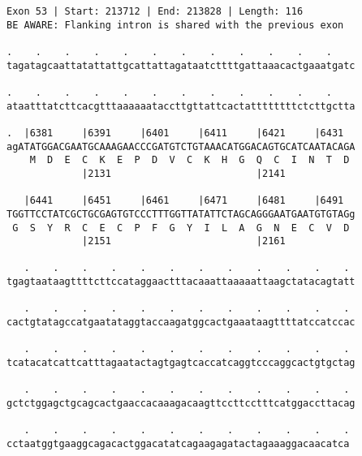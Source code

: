 \documentclass{article}
\begin{document}
\begin{Verbatim}
Exon 53 | Start: 213712 | End: 213828 | Length: 116
BE AWARE: Flanking intron is shared with the previous exon
 
.    .    .    .    .    .    .    .    .    .    .    .    
tagatagcaattatattattgcattattagataatcttttgattaaacactgaaatgatc
  
.    .    .    .    .    .    .    .    .    .    .    .    
ataatttatcttcacgtttaaaaaataccttgttattcactattttttttctcttgctta
  
.  |6381     |6391     |6401     |6411     |6421     |6431  
agATATGGACGAATGCAAAGAACCCGATGTCTGTAAACATGGACAGTGCATCAATACAGA
    M  D  E  C  K  E  P  D  V  C  K  H  G  Q  C  I  N  T  D 
             |2131                         |2141            
  
   |6441     |6451     |6461     |6471     |6481     |6491  
TGGTTCCTATCGCTGCGAGTGTCCCTTTGGTTATATTCTAGCAGGGAATGAATGTGTAGg
 G  S  Y  R  C  E  C  P  F  G  Y  I  L  A  G  N  E  C  V  D 
             |2151                         |2161            
  
   .    .    .    .    .    .    .    .    .    .    .    . 
tgagtaataagttttcttccataggaactttacaaattaaaaattaagctatacagtatt
  
   .    .    .    .    .    .    .    .    .    .    .    . 
cactgtatagccatgaatataggtaccaagatggcactgaaataagttttatccatccac
  
   .    .    .    .    .    .    .    .    .    .    .    . 
tcatacatcattcatttagaatactagtgagtcaccatcaggtcccaggcactgtgctag
  
   .    .    .    .    .    .    .    .    .    .    .    . 
gctctggagctgcagcactgaaccacaaagacaagttccttcctttcatggaccttacag
  
   .    .    .    .    .    .    .    .    .    .    .    .
cctaatggtgaaggcagacactggacatatcagaagagatactagaaaggacaacatca
\end{Verbatim}
\newpage
\end{document}

